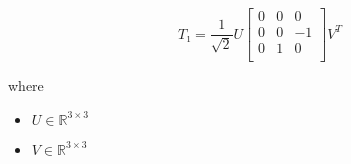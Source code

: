\documentclass[12pt]{article}
\begin{document}
\[
\textit{T₁} = \frac{1}{ \sqrt{2}}\textit{U}\begin{bmatrix}
0 & 0 & 0\\
0 & 0 & -1\\
0 & 1 & 0\\
\end{bmatrix}\textit{V}^T
\]

where
\begin{itemize}
\item $\textit{U} \in \mathbb{R}^{ 3 \times 3 }$
\item $\textit{V} \in \mathbb{R}^{ 3 \times 3 }$
\end{itemize}
\end{document}
